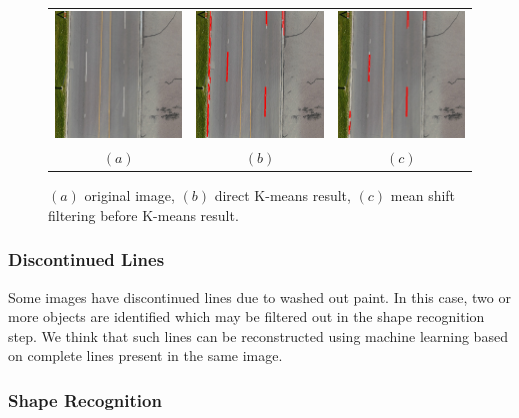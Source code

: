 \documentclass{m2pi}
\begin{document}
\begin{figure}[htp]
\centering
\begin{tabular}{ccc}
\includegraphics[width=3.8cm]{figures/Resized_Road3.jpg}&
\includegraphics[width=3.8cm]{figures/Detected_Road3.jpg}&
\includegraphics[width=3.8cm]{figures/Detected_Road3_meanshift.jpg}\\
$(a)$ & $(b)$ & $(c)$
\end{tabular}
\caption{$(a)$ original image, 
$(b)$ direct K-means result,
$(c)$ mean shift filtering before K-means result.}
\label{road3result}
\end{figure}

\subsubsection{Discontinued Lines}

Some images have discontinued lines due to washed out paint. In this case, two or more objects are identified which may be filtered out in the shape recognition step. We think that such lines can be reconstructed using machine learning based on complete lines present in the same image.

\subsubsection{Shape Recognition}
\end{document}
